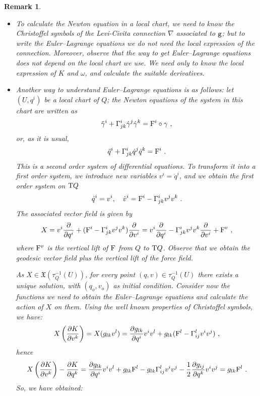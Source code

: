 \documentclass[12pt]{report}
\newtheorem{remark}[teor]{Remark}
\def\bit{\begin{itemize}}
\def\eit{\end{itemize}}
\def\derpar#1#2{\frac{\partial{#1}}{\partial{#2}}}
\def\vf{\mathfrak X}
\def\Tan{{\rm T}}
\begin{document}
\begin{remark}{\rm 
\bit
\item
To calculate the Newton equation in a local chart, we need to know the Christoffel symbols 
of the Levi-Civita connection $\nabla$ associated to ${\tt g}$;
but to write the Euler--Lagrange equations we do not need the local expression of the connection. 
Moreover, observe that the way to get Euler--Lagrange equations does not depend on the local chart we use. We need only to know the local expression of $K$ and $\omega$, and calculate the suitable derivatives.
\item
Another way to understand Euler--Lagrange equations is as follows:
let $(U,q^i)$ be a local chart of $Q$; 
the Newton equations of the system in this chart are written as
$$
\ddot\gamma^i+\Gamma^i_{jk}\dot\gamma^j\dot\gamma^k={\rm F}^i\circ\gamma  \ ,
$$
or, as it is usual,
$$
\ddot q^i+\Gamma^i_{jk}\dot q^j\dot q^k={\rm F}^i \ .
$$
This is a second order system of differential equations. 
To transform it into a first order system, we introduce new variables
$v^i=\dot q^i$, and we obtain the first order system on $\Tan Q$
$$
\dot q^i = v^i ,\quad
\dot v^i = {\rm F}^i-\Gamma^i_{jk}v^jv^k \ .
$$
The associated vector field is given by
$$
X=v^i\derpar{}{q^i}+({\rm F}^i-\Gamma^i_{jk}v^jv^k)\derpar{}{v^i} =v^i\derpar{}{q^i}-\Gamma^i_{jk}v^jv^k\derpar{}{v^i}+{\rm F}^v\ ,
$$
where ${\rm F}^v$ is the vertical lift of ${\rm F}$ from $Q$ to $\Tan Q$. Observe that we obtain the geodesic vector field plus the vertical lift of the force field. 

As $X\in\vf (\tau_Q^{-1}(U))$, for every point $(q,v)\in\tau_Q^{-1}(U)$
there exists a unique solution, with $(q_o,v_o)$ as initial condition. 
Consider now the functions we need to obtain 
the Euler--Lagrange equations and calculate the action of $X$ on them. 
Using the well known properties of Christoffel symbols, we have:
$$
X\left(\derpar{K}{v^k}\right) = X(g_{lk}v^l)=
\derpar{g_{lk}}{q^i}v^iv^l+g_{lk}({\rm F}^l-\Gamma_{ij}^lv^iv^j) \ ,
$$
hence
$$
X\left(\derpar{K}{v^k}\right) -\derpar{K}{q^k} =
\derpar{g_{lk}}{q^i}v^iv^l+g_{lk}{\rm F}^l-g_{lk}\Gamma_{ij}^lv^iv^j-
\frac{1}{2}\derpar{g_{ij}}{q^k}v^iv^j=g_{lk}{\rm F}^l \ .
$$
So, we have obtained:
\eit
}\end{remark}
\end{document}
